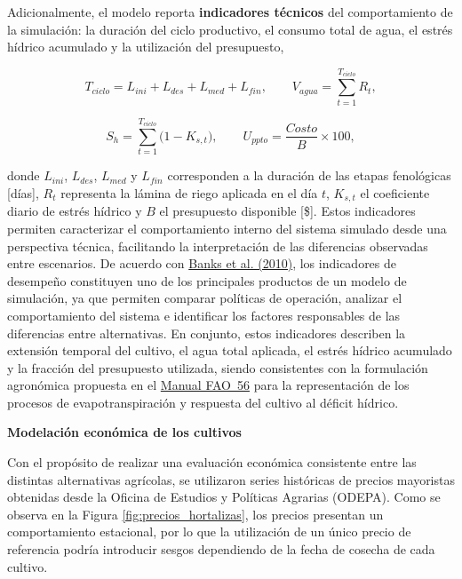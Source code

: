 \documentclass[12pt]{report}
\newcommand{\citeref}[2]{\hyperlink{ref:#1}{#2}}
\begin{document}
\vspace{0.2cm}

Adicionalmente, el modelo reporta \textbf{indicadores técnicos} del comportamiento de la simulación: la duración del ciclo productivo, el consumo total de agua, el estrés hídrico acumulado y la utilización del presupuesto,

\vspace{0.2cm}

\begin{equation}
T_{ciclo} = L_{ini}+L_{des}+L_{med}+L_{fin},
\qquad
V_{agua} = \sum_{t=1}^{T_{ciclo}} R_t,
\end{equation}

\begin{equation}
S_h = \sum_{t=1}^{T_{ciclo}} \big(1 - K_{s,t}\big),
\qquad
U_{ppto} = \frac{Costo}{B}\times 100,
\end{equation}

\vspace{0.2cm}

donde $L_{ini}$, $L_{des}$, $L_{med}$ y $L_{fin}$ corresponden a la duración de las etapas fenológicas [días], $R_t$ representa la lámina de riego aplicada en el día $t$, $K_{s,t}$ el coeficiente diario de estrés hídrico y $B$ el presupuesto disponible [\$]. Estos indicadores permiten caracterizar el comportamiento interno del sistema simulado desde una perspectiva técnica, facilitando la interpretación de las diferencias observadas entre escenarios. De acuerdo con \citeref{banks2010}{Banks et al. (2010)}, los indicadores de desempeño constituyen uno de los principales productos de un modelo de simulación, ya que permiten comparar políticas de operación, analizar el comportamiento del sistema e identificar los factores responsables de las diferencias entre alternativas. En conjunto, estos indicadores describen la extensión temporal del cultivo, el agua total aplicada, el estrés hídrico acumulado y la fracción del presupuesto utilizada, siendo consistentes con la formulación agronómica propuesta en el \citeref{allen1998}{Manual FAO~56} para la representación de los procesos de evapotranspiración y respuesta del cultivo al déficit hídrico.
\item \textbf{Modelación económica de los cultivos}

Con el propósito de realizar una evaluación económica consistente entre las distintas alternativas agrícolas, se utilizaron series históricas de precios mayoristas obtenidas desde la Oficina de Estudios y Políticas Agrarias (ODEPA). Como se observa en la Figura \ref{fig:precios_hortalizas}, los precios presentan un comportamiento estacional, por lo que la utilización de un único precio de referencia podría introducir sesgos dependiendo de la fecha de cosecha de cada cultivo.
\end{document}
